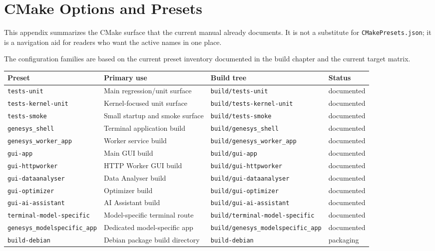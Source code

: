 \chapter{CMake Options and Presets}
\label{chap:appendix-cmake-options-and-presets}

This appendix summarizes the CMake surface that the current manual already
documents. It is not a substitute for \texttt{CMakePresets.json}; it is a
navigation aid for readers who want the active names in one place.

The configuration families are based on the current preset inventory
documented in the build chapter and the current target matrix. 

\begin{table}[htbp]
\centering
\small
\begin{tabular}{|p{3.2cm}|p{4.0cm}|p{3.6cm}|p{2.0cm}|}
\hline
\textbf{Preset} & \textbf{Primary use} & \textbf{Build tree} & \textbf{Status} \\
\hline
\texttt{tests-unit} & Main regression/unit surface & \texttt{build/tests-unit} & documented \\
\hline
\texttt{tests-kernel-unit} & Kernel-focused unit surface & \texttt{build/tests-kernel-unit} & documented \\
\hline
\texttt{tests-smoke} & Small startup and smoke surface & \texttt{build/tests-smoke} & documented \\
\hline
\texttt{genesys\_shell} & Terminal application build & \texttt{build/genesys\_shell} & documented \\
\hline
\texttt{genesys\_worker\_app} & Worker service build & \texttt{build/genesys\_worker\_app} & documented \\
\hline
\texttt{gui-app} & Main GUI build & \texttt{build/gui-app} & documented \\
\hline
\texttt{gui-httpworker} & HTTP Worker GUI build & \texttt{build/gui-httpworker} & documented \\
\hline
\texttt{gui-dataanalyser} & Data Analyser build & \texttt{build/gui-dataanalyser} & documented \\
\hline
\texttt{gui-optimizer} & Optimizer build & \texttt{build/gui-optimizer} & documented \\
\hline
\texttt{gui-ai-assistant} & AI Assistant build & \texttt{build/gui-ai-assistant} & documented \\
\hline
\texttt{terminal-model-specific} & Model-specific terminal route & \texttt{build/terminal-model-specific} & documented \\
\hline
\texttt{genesys\_modelspecific\_app} & Dedicated model-specific app & \texttt{build/genesys\_modelspecific\_app} & documented \\
\hline
\texttt{build-debian} & Debian package build directory & \texttt{build-debian} & packaging \\
\hline
\end{tabular}
\end{table}

